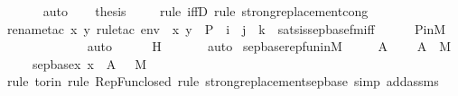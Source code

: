 \begin{isabellebody}
\ \ \ \ \isamarkupfalse%
\ auto\isanewline
\ \ \isamarkupfalse%
\ {\isacharquery}{\kern0pt}thesis\isanewline
\ \ \ \ \isamarkupfalse%
{\isacharparenleft}{\kern0pt}rule\ iffD{}{\isacharcomma}{\kern0pt}\ rule\ strong{\isacharunderscore}{\kern0pt}replacement{\isacharunderscore}{\kern0pt}cong{\isacharparenright}{\kern0pt}\isanewline
\ \ \ \ \ \isamarkupfalse%
{\isacharparenleft}{\kern0pt}rename{\isacharunderscore}{\kern0pt}tac\ x\ y{\isacharcomma}{\kern0pt}\ rule{\isacharunderscore}{\kern0pt}tac\ env\ {\isacharequal}{\kern0pt}\ {\isachardoublequoteopen}{\isacharbrackleft}{\kern0pt}x{\isacharcomma}{\kern0pt}\ y{\isacharbrackright}{\kern0pt}\ {\isacharat}{\kern0pt}\ {\isacharbrackleft}{\kern0pt}P{\isacharbrackright}{\kern0pt}{\isachardoublequoteclose}\ \ i{\isacharequal}{\kern0pt}{}\ \ j{\isacharequal}{\kern0pt}{}\ \ k{\isacharequal}{\kern0pt}{}\ \ sats{\isacharunderscore}{\kern0pt}is{\isacharunderscore}{\kern0pt}sep{\isacharunderscore}{\kern0pt}base{\isacharunderscore}{\kern0pt}fm{\isacharunderscore}{\kern0pt}iff{\isacharparenright}{\kern0pt}\isanewline
\ \ \ \ \isamarkupfalse%
\ P{\isacharunderscore}{\kern0pt}in{\isacharunderscore}{\kern0pt}M\isanewline
\ \ \ \ \ \ \ \ \ \ \ \isamarkupfalse%
\ auto{\isacharbrackleft}{\kern0pt}{}{\isacharbrackright}{\kern0pt}\isanewline
\ \ \ \ \isamarkupfalse%
\ H\ \isanewline
\ \ \ \ \isamarkupfalse%
\ auto\isanewline
{}\isamarkupfalse%
%
\endisatagproof
{\isafoldproof}%
%
\isadelimproof
\isanewline
%
\endisadelimproof
\isanewline
{}\isamarkupfalse%
\ sep{\isacharunderscore}{\kern0pt}base{\isacharunderscore}{\kern0pt}repfun{\isacharunderscore}{\kern0pt}in{\isacharunderscore}{\kern0pt}M\ {\isacharcolon}{\kern0pt}\ \isanewline
\ \ \ A\ \isanewline
\ \ \ {\isachardoublequoteopen}A\ {\isasymin}\ M{\isachardoublequoteclose}\ \isanewline
\ \ \ {\isachardoublequoteopen}{\isacharbraceleft}{\kern0pt}\ sep{\isacharunderscore}{\kern0pt}base{\isacharparenleft}{\kern0pt}x{\isacharparenright}{\kern0pt}{\isachardot}{\kern0pt}\ x\ {\isasymin}\ A\ {\isacharbraceright}{\kern0pt}\ {\isasymin}\ M{\isachardoublequoteclose}\isanewline
%
\isadelimproof
\isanewline
\ \ %
\endisadelimproof
%
\isatagproof
{}\isamarkupfalse%
{\isacharparenleft}{\kern0pt}rule\ to{\isacharunderscore}{\kern0pt}rin{\isacharcomma}{\kern0pt}\ rule\ RepFun{\isacharunderscore}{\kern0pt}closed{\isacharcomma}{\kern0pt}\ rule\ strong{\isacharunderscore}{\kern0pt}replacement{\isacharunderscore}{\kern0pt}sep{\isacharunderscore}{\kern0pt}base{\isacharcomma}{\kern0pt}\ simp\ add{\isacharcolon}{\kern0pt}assms{\isacharparenright}{\kern0pt}\isanewline

\end{isabellebody}

